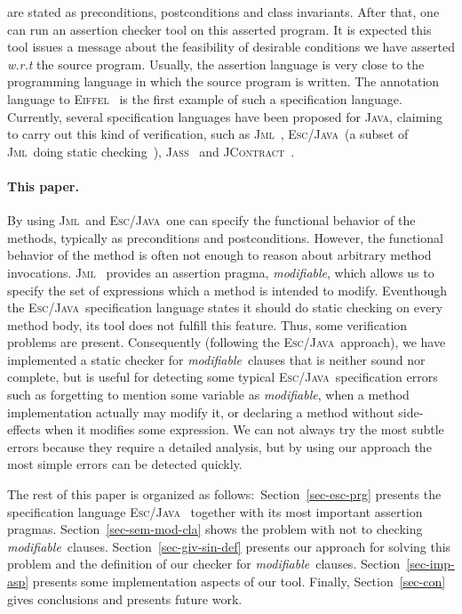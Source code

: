 \documentclass[a4paper]{llncs}
\newcommand{\jml}{\textsc{Jml}}
\newcommand{\escj}{\textsc{Esc/Java}}
\newcommand{\jass}{\textsc{Jass}}
\newcommand{\jcontract}{\textsc{JContract}}
\newcommand{\java}{\textsc{Java}}
\newcommand{\eiff}{\textsc{Eiffel}}
\newcommand{\modif}{\textit{modifiable}}
\begin{document}
are
stated as
preconditions, postconditions and class invariants. After that, one
can 
run an assertion checker tool on this asserted program. It is expected
this tool issues a message about the feasibility of desirable
conditions we have asserted
\emph{w.r.t} the source program. Usually, the assertion language is 
very close to the programming language in which the source program is
written. The
annotation language to
\eiff~\cite{Mey97} is the first example of such a
specification language. Currently, several specification languages have
been proposed for \java, claiming to carry out this kind of
verification, such as \jml~\cite{LBR00}, \escj~\cite{LeinoNS00}(a
subset of \jml~doing static checking~\cite{EscJmlDiff}),
\jass~\cite{JassUrl} and \jcontract~\cite{JContractUrl}.



\paragraph{\bf This paper.}By using \jml~and \escj~one can specify the
functional
behavior of the methods, typically as preconditions and
postconditions. However, the functional behavior of the method is
often not enough to reason about arbitrary method invocations. \jml~
provides an assertion pragma, \modif, which allows us to
specify the set of expressions which a method is intended to
modify. Eventhough the \escj~specification language states it should
do static checking on every method body, its tool does not fulfill
this feature. Thus, some verification problems are
present. Consequently (following the \escj~approach), we have
implemented a static checker for \modif~clauses that is neither
sound nor complete, but is useful
for detecting some typical \escj~specification errors such as
forgetting to mention some variable
as \modif, when a method implementation actually may modify it, or
declaring a method without side-effects when it modifies some
expression. We can not always try the most subtle errors because they 
require a detailed analysis, but by using our approach the most
simple errors can be detected quickly.

The rest of this paper is organized as follows$:$
Section~\ref{sec-esc-prg} presents the specification language \escj~
together with its most important assertion
pragmas. Section~\ref{sec-sem-mod-cla} shows the problem
with not to checking \modif~clauses. Section~\ref{sec-giv-sin-def}
presents our approach for solving this problem and the definition of
our checker for \modif~clauses. Section~\ref{sec-imp-asp} presents
some implementation aspects of our tool. Finally, Section~\ref{sec-con}
gives conclusions and presents future work.
\end{document}
